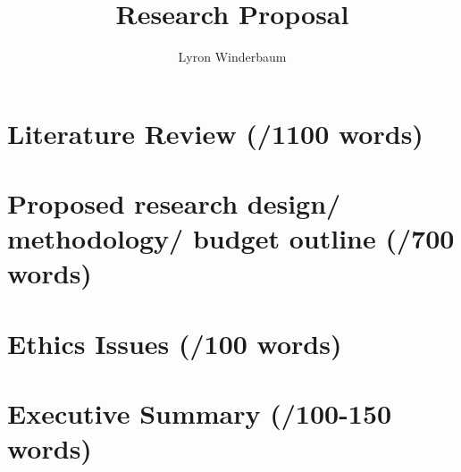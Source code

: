 \documentclass[14pt]{memoir}
\title{Research Proposal}
\author{Lyron Winderbaum}
\begin{document}
\maketitle

\begin{abstract}

\lipsum[1-2]

\end{abstract}



\section*{Literature Review (/1100 words)}

\section*{Proposed research design/ methodology/ budget outline (/700 words)}

\section*{Ethics Issues (/100 words)}

\section*{Executive Summary (/100-150 words)}




 
\end{document}
